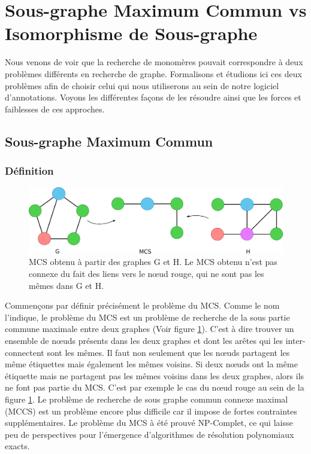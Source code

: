 \section{Sous-graphe Maximum Commun vs Isomorphisme de Sous-graphe}
\label{SI_MCS}

Nous venons de voir que la recherche de monomères pouvait correspondre à deux problèmes différents en recherche de graphe.
Formalisons et étudions ici ces deux problèmes afin de choisir celui qui nous utiliserons au sein de notre logiciel d'annotations.
Voyons les différentes façons de les résoudre ainsi que les forces et faiblesses de ces approches.


\subsection{Sous-graphe Maximum Commun}

\subsubsection{Définition}

\begin{figure}[!ht]
  \begin{center}
    \includegraphics[width=450px]{Figures/s2m/MCS-SI/mcs.png}
    \caption{\label{mcs_fig}MCS obtenu à partir des graphes G et H.
    Le MCS obtenu n'est pas connexe du fait des liens vers le n\oe{}ud rouge, qui ne sont pas les mêmes dans G et H.}
  \end{center}
\end{figure}

Commençons par définir précisément le problème du MCS.
Comme le nom l'indique, le problème du MCS est un problème de recherche de la sous partie commune maximale entre deux graphes (Voir figure \ref{mcs_fig}).
C'est à dire trouver un ensemble de n\oe{}uds présents dans les deux graphes et dont les arêtes qui les inter-connectent sont les mêmes.
Il faut non seulement que les n\oe{}uds partagent les même étiquettes mais également les mêmes voisins.
Si deux n\oe{}uds ont la même étiquette mais ne partagent pas les mêmes voisins dans les deux graphes, alors ils ne font pas partie du MCS.
C'est par exemple le cas du n\oe{}ud rouge au sein de la figure \ref{mcs_fig}.
Le problème de recherche de sous graphe commun connexe maximal (MCCS) est un problème encore plus difficile car il impose de fortes contraintes supplémentaires.
Le problème du MCS à été prouvé NP-Complet\cite{garey_computers_1979}, ce qui laisse peu de perspectives pour l'émergence d'algorithmes de résolution polynomiaux exacts.

